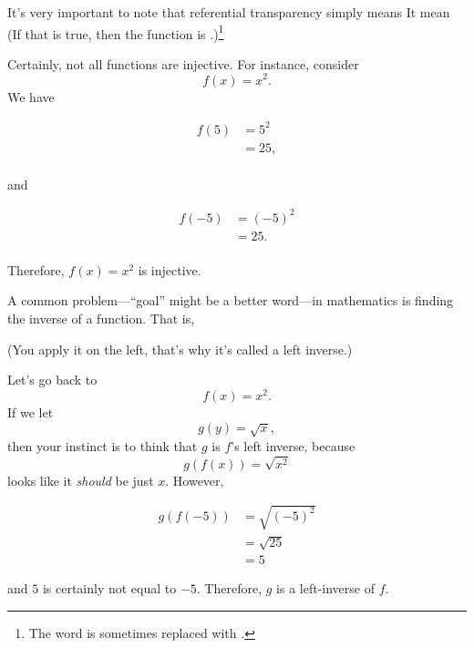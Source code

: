 \begin{remark}
  It's very important to note that referential transparency simply
  means  It  mean
   (If that is true, then the
  function is .)\footnote{The word  is
    sometimes replaced with .}

  Certainly, not all functions are injective. For instance,
  consider $$f(x) = x^2.$$ We have

  \begin{align*}
    f(5) & = 5^2 \\
         & = 25, \\
  \end{align*}

  and

  \begin{align*}
    f(-5) & = (-5)^2 \\
         & = 25. \\
  \end{align*}

  Therefore, $f(x) = x^2$ is  injective.
\end{remark}

\begin{aside}
  A common problem---``goal'' might be a better word---in mathematics
  is finding the inverse of a function. That is, 

  (You apply it on the left, that's why it's called a left inverse.)

  Let's go back to $$f(x) = x^2.$$ If we let $$g(y) = \sqrt{x},$$ then
  your instinct is to think that $g$ is $f$'s left inverse, because
  $$g(f(x)) = \sqrt{x^2}$$ looks like it \emph{should} be just
  $x$. However,

  \begin{align*}
    g(f(-5)) & = \sqrt{(-5)^2} \\
             & = \sqrt{25} \\
             & = 5
  \end{align*}

  and $5$ is certainly not equal to $-5$. Therefore, $g$ is 
  a left-inverse of $f$.
\end{aside}



